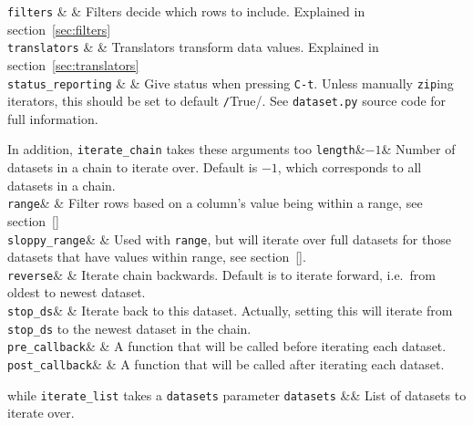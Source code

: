   \RP \texttt{filters} & \pyNone & Filters decide which rows to include.
  Explained in section~\ref{sec:filters}\\[1ex]

  \RP \texttt{translators} & \pyNone & Translators transform data values.
  Explained in section~\ref{sec:translators}\\[1ex]
  
  \RP \texttt{status\_reporting} & \pyTrue & Give status when pressing
  \texttt{C-t}.  Unless manually \texttt{zip}ing iterators, this
  should be set to default \texttt/True/.  See
  \texttt{dataset.py} source code for full information.\\
\stoptable

\noindent In addition, \texttt{iterate\_chain} takes these arguments too
\starttable
  \RP \texttt{length}&$-1$& Number of datasets in a chain to iterate over.
  Default is $-1$, which corresponds to all datasets in a chain.\\[1ex]
  
  \RP \texttt{range}& \pyNone& Filter rows based on a column's value being
  within a range, see section~\ref{}\\[1ex]

  \RP \texttt{sloppy\_range}& \pyFalse & Used with \texttt{range}, but will
  iterate over full datasets for those datasets that have values
  within range, see section~\ref{}.\\[1ex]
  
  \RP \texttt{reverse}& \pyFalse & Iterate chain
  backwards.  Default is to iterate forward, i.e.\ from oldest to
  newest dataset.\\[1ex]

  \RP \texttt{stop\_ds}& \pyNone & Iterate back to this dataset.  Actually, setting
  this will iterate from \texttt{stop\_ds} to the newest dataset in the chain.\\[1ex]

  \RP \texttt{pre\_callback}& \pyNone & A function that will be called before
  iterating each dataset.\\[1ex]

  \RP \texttt{post\_callback}& \pyNone & A function that will be called after
  iterating each dataset.\\
\stoptable

\noindent while \texttt{iterate\_list} takes a \texttt{datasets} parameter
\starttable
  \RP \texttt{datasets} &\pyNone& List of datasets to iterate over.
\stoptable



